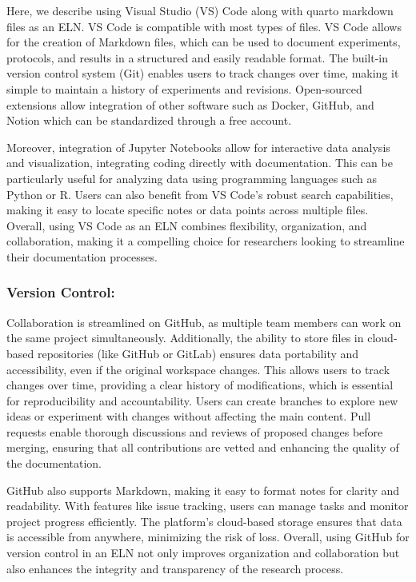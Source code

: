 \documentclass[
  letterpaper,
]{book}
\begin{document}
Here, we describe using Visual Studio (VS) Code along with quarto
markdown files as an ELN. VS Code is compatible with most types of
files. VS Code allows for the creation of Markdown files, which can be
used to document experiments, protocols, and results in a structured and
easily readable format. The built-in version control system (Git)
enables users to track changes over time, making it simple to maintain a
history of experiments and revisions. Open-sourced extensions allow
integration of other software such as Docker, GitHub, and Notion which
can be standardized through a free account.

Moreover, integration of Jupyter Notebooks allow for interactive data
analysis and visualization, integrating coding directly with
documentation. This can be particularly useful for analyzing data using
programming languages such as Python or R. Users can also benefit from
VS Code's robust search capabilities, making it easy to locate specific
notes or data points across multiple files. Overall, using VS Code as an
ELN combines flexibility, organization, and collaboration, making it a
compelling choice for researchers looking to streamline their
documentation processes.

\subsubsection{Version Control:}\label{version-control}

Collaboration is streamlined on GitHub, as multiple team members can
work on the same project simultaneously. Additionally, the ability to
store files in cloud-based repositories (like GitHub or GitLab) ensures
data portability and accessibility, even if the original workspace
changes. This allows users to track changes over time, providing a clear
history of modifications, which is essential for reproducibility and
accountability. Users can create branches to explore new ideas or
experiment with changes without affecting the main content. Pull
requests enable thorough discussions and reviews of proposed changes
before merging, ensuring that all contributions are vetted and enhancing
the quality of the documentation.

GitHub also supports Markdown, making it easy to format notes for
clarity and readability. With features like issue tracking, users can
manage tasks and monitor project progress efficiently. The platform's
cloud-based storage ensures that data is accessible from anywhere,
minimizing the risk of loss. Overall, using GitHub for version control
in an ELN not only improves organization and collaboration but also
enhances the integrity and transparency of the research process.
\end{document}
